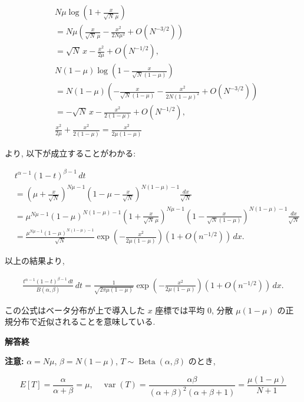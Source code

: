 \documentclass[
  letterpaper,
  DIV=11,
  numbers=noendperiod]{scrartcl}
\begin{document}
\[
\begin{aligned}
&
N\mu\log\left(1+\frac{x}{\sqrt{N}\,\mu}\right)
\\ &=
N\mu\left(\frac{x}{\sqrt{N}\,\mu} - \frac{x^2}{2N\mu^2} + O(N^{-3/2})\right)
\\ &=
\sqrt{N}\,x - \frac{x^2}{2\mu} + O(N^{-1/2}),
\\ &
N(1-\mu)\log\left(1-\frac{x}{\sqrt{N}(1-\mu)}\right) 
\\ &=
N(1-\mu)\left(-\frac{x}{\sqrt{N}(1-\mu)} - \frac{x^2}{2N(1-\mu)^2} + O(N^{-3/2})\right)
\\ &= -
\sqrt{N}\,x - \frac{x^2}{2(1-\mu)} + O(N^{-1/2}),
\\ &
\frac{x^2}{2\mu} + \frac{x^2}{2(1-\mu)} = \frac{x^2}{2\mu(1-\mu)}
\end{aligned}
\]

より, 以下が成立することがわかる:

\[
\begin{aligned}
&
t^{\alpha-1}(1-t)^{\beta-1}\,dt
\\ &=
\left(\mu + \frac{x}{\sqrt{N}}\right)^{N\mu-1}
\left(1 - \mu - \frac{x}{\sqrt{N}}\right)^{N(1-\mu)-1}
\frac{dx}{\sqrt{N}}
\\ &=
\mu^{N\mu-1} (1-\mu)^{N(1-\mu)-1}
\left(1+\frac{x}{\sqrt{N}\,\mu}\right)^{N\mu-1}
\left(1-\frac{x}{\sqrt{N}(1-\mu)}\right) ^{N(1-\mu)-1}
\frac{dx}{\sqrt{N}}
\\ &=
\frac{\mu^{N\mu-1} (1-\mu)^{N(1-\mu)-1}}{\sqrt{N}}
\exp\left(-\frac{x^2}{2\mu(1-\mu)}\right) (1 + O(n^{-1/2}))
\,dx.
\end{aligned}
\]

以上の結果より,

\[
\begin{aligned}
\frac{t^{\alpha-1}(1-t)^{\beta-1}\,dt}{B(\alpha,\beta)}\,dt =
\frac{1}{\sqrt{2\pi\mu(1-\mu)}}
\exp\left(-\frac{x^2}{2\mu(1-\mu)}\right) (1 + O(n^{-1/2}))
\,dx.
\end{aligned}
\]

この公式はベータ分布が上で導入した \(x\) 座標では平均 \(0\), 分散
\(\mu(1-\mu)\) の正規分布で近似されることを意味している.

\textbf{解答終}

\textbf{注意:} \(\alpha = N\mu\), \(\beta = N(1-\mu)\),
\(T\sim\operatorname{Beta}(\alpha,\beta)\) のとき,

\[
E[T] = \frac{\alpha}{\alpha+\beta} = \mu, \quad
\operatorname{var}(T) =
\frac{\alpha\beta}{(\alpha+\beta)^2(\alpha+\beta+1)} =
\frac{\mu(1-\mu)}{N+1}
\]
\end{document}
